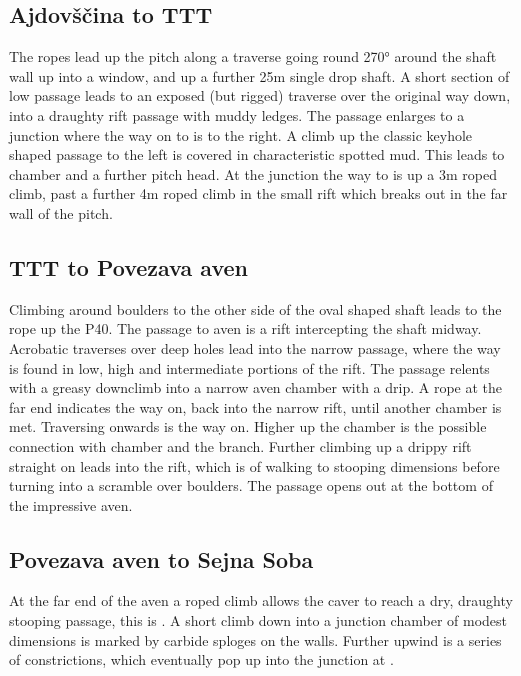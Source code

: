 \subsection{Ajdov\v{s}\v{c}ina to TTT}
The ropes lead up the  pitch along a traverse going round 270° around the shaft wall up into a window, and up a further 25m single drop shaft. A short section of low passage leads to an exposed (but rigged) traverse over the original way down, into a draughty rift passage with muddy ledges. The passage enlarges to a junction where the way on to  is to the right. A climb up the classic keyhole shaped passage to the left is covered in characteristic spotted mud. This leads to  chamber and a further pitch head. At the junction the way to  is up a 3m roped climb, past a further 4m roped climb in the small rift which breaks out in the far wall of the  pitch.

\subsection{TTT to Povezava aven}
Climbing around boulders to the other side of the oval shaped shaft leads to the rope up the P40. The passage to  aven is a rift intercepting the shaft midway. Acrobatic traverses over deep holes lead into the narrow passage, where the way is found in low, high and intermediate portions of the rift. The passage relents with a greasy downclimb into a narrow aven chamber with a drip. A rope at the far end indicates the way on, back into the narrow rift, until another chamber is met. Traversing onwards is the way on. Higher up the chamber is the possible connection with  chamber and the  branch. Further climbing up a drippy rift straight on leads into the  rift, which is of walking to stooping dimensions before turning into a scramble over boulders. The passage opens out at the bottom of the impressive  aven.

\subsection{Povezava aven to Sejna Soba}
At the far end of the aven a roped climb allows the caver to reach a dry, draughty stooping passage, this is . A short climb down into a junction chamber of modest dimensions is marked by carbide sploges on the walls. Further upwind is a series of constrictions, which eventually pop up into the junction at .


